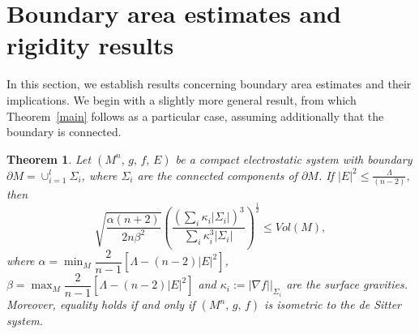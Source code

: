\documentclass{amsart}
\newtheorem{theorem}{Theorem}
\numberwithin{equation}{section}
\begin{document}
	
\section{Boundary area estimates and rigidity results}

In this section, we establish results concerning boundary area estimates and their implications. We begin with a slightly more general result, from which Theorem~\ref{main}  follows as a particular case, assuming additionally that the boundary is connected.


\begin{theorem}\label{teoAgen}
Let $(M^n,\, g,\, f,\,E)$ be a compact electrostatic system with  boundary $\partial M=\displaystyle\cup_{i=1}^{l} \Sigma_{i}$, where $\Sigma_{i}$ are the connected components of $\partial M$. If $|E|^2\leq\frac{\Lambda}{(n-2)},$ then
\[
\sqrt{\frac{\alpha(n+2)}{2n\beta^{2}}} \left(\frac{\left( \sum_{i} \kappa_{i} |\Sigma_{i}| \right)^3}{\sum_{i} \kappa_{i}^3 |\Sigma_{i}|} \right)^{\frac{1}{2}}\leq Vol(M),
\]
where $ \alpha = \min_{M}\dfrac{2}{n - 1}\left[\Lambda - (n - 2)|E|^2\right]$, $ \beta = \max_{M} \dfrac{2}{n - 1}\left[\Lambda - (n - 2)|E|^2\right]$ and $\kappa_{i}:=|\nabla f|\Big|_{\Sigma_{i}}$ are the surface gravities. Moreover, equality holds if and only if $(M^n,\, g,\, f)$ is isometric to the de Sitter system. 
\end{theorem}
\end{document}
